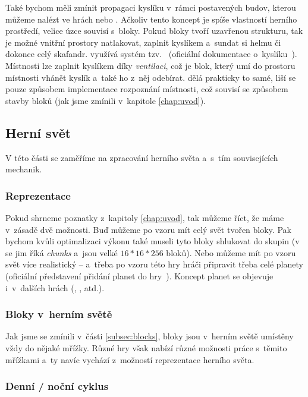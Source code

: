 Také bychom měli zmínit propagaci kyslíku v~rámci postavených budov, kterou můžeme nalézt ve hrách \SE{} nebo \TM{}. Ačkoliv tento koncept je spíše vlastností herního prostředí, velice úzce souvisí s~bloky. Pokud bloky tvoří uzavřenou strukturu, tak je možné vnitřní prostory natlakovat, zaplnit kyslíkem a~sundat si helmu či dokonce celý skafandr. \SE{} využívá systém tzv.~ (oficiální dokumentace o~kyslíku~\citep{se_oxygen}). Místnosti lze zaplnit kyslíkem díky \textit{ventilaci}, což je blok, který umí do prostoru místnosti vhánět kyslík a~také ho z~něj odebírat. \TM{} dělá prakticky to samé, liší se pouze způsobem implementace rozpoznání místnosti, což souvisí se způsobem stavby bloků (jak jsme zmínili v~kapitole \ref{chap:uvod}).


\subsection{Herní svět}

V této části se zaměříme na zpracování herního světa a~s~tím souvisejících mechanik.

\subsubsection{Reprezentace}

Pokud shrneme poznatky z~kapitoly \ref{chap:uvod}, tak můžeme říct, že máme v~zásadě dvě možnosti. Buď můžeme po vzoru \MC{} mít celý svět tvořen bloky. Pak bychom kvůli optimalizaci výkonu také museli tyto bloky shlukovat do skupin (v  se jim říká \textit{chunks} a~jsou velké $16*16*256$ bloků). Nebo můžeme mít po vzoru \SE{} svět více realistický -- a~třeba po vzoru této hry hráči připravit třeba celé planety (oficiální představení přidání planet do hry~\citep{se_planets}). Koncept planet se objevuje i~v~dalších hrách (\ME{}, \NMS{}, atd.).

\subsubsection{Bloky v~herním světě}

Jak jsme se zmínili v~části \ref{subsec:blocks}, bloky jsou v~herním světě umístěny vždy do nějaké mřížky. Různé hry však nabízí různé možnosti práce s~těmito mřížkami a~ty navíc vychází z~možností reprezentace herního světa.


\subsubsection{Denní / noční cyklus}

